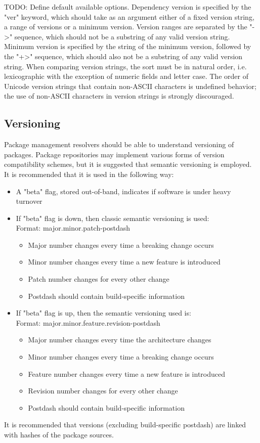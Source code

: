 TODO: Define default available options.
Dependency version is specified by the "ver" keyword, which should take as an argument either of a fixed version string, a range of versions or a minimum version. Version ranges are separated by the "->" sequence, which should not be a substring of any valid version string. Minimum version is specified by the string of the minimum version, followed by the "+>" sequence, which should also not be a substring of any valid version string. When comparing version strings, the sort must be in natural order, i.e. lexicographic with the exception of numeric fields and letter case. The order of Unicode version strings that contain non-ASCII characters is undefined behavior; the use of non-ASCII characters in version strings is strongly discouraged.
\subsection{Versioning}
Package management resolvers should be able to understand versioning of packages. Package repositories may implement various forms of version compatibility schemes, but it is suggested that semantic versioning is employed. It is recommended that it is used in the following way:
\begin{itemize}
	\item A "beta" flag, stored out-of-band, indicates if software is under heavy turnover
	\item If "beta" flag is down, then classic semantic versioning is used:\\
	Format: major.minor.patch-postdash
	\begin{itemize}
		\item Major number changes every time a breaking change occurs
		\item Minor number changes every time a new feature is introduced
		\item Patch number changes for every other change
		\item Postdash should contain build-specific information
	\end{itemize}
	\item If "beta" flag is up, then the semantic versioning used is:\\
	Format: major.minor.feature.revision-postdash
	\begin{itemize}
		\item Major number changes every time the architecture changes
		\item Minor number changes every time a breaking change occurs
		\item Feature number changes every time a new feature is introduced
		\item Revision number changes for every other change
		\item Postdash should contain build-specific information
	\end{itemize}
\end{itemize}
It is recommended that versions (excluding build-specific postdash) are linked with hashes of the package sources.
